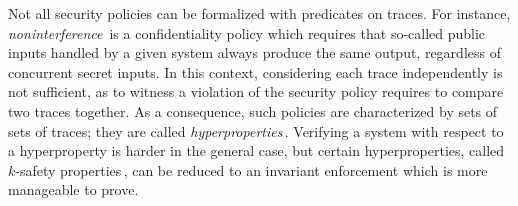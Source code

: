 Not all security policies can be formalized with predicates on traces.
%
For instance, \emph{noninterference}\,\cite{goguen1982security} is a
confidentiality policy which requires that so-called public inputs handled by a
given system always produce the same output, regardless of concurrent secret
inputs.
%
In this context, considering each trace independently is not sufficient, as to
witness a violation of the security policy requires to compare two traces
together.
%
As a consequence, such policies are characterized by sets of sets of traces;
they are called \emph{hyperproperties}\,\cite{marr2002hypertheading}.
%
Verifying a system with respect to a hyperproperty is harder in the general
case, but certain hyperproperties, called \( k \)-safety
properties\,\cite{marr2002hypertheading}, can be reduced to an invariant
enforcement which is more manageable to prove.
%

%

